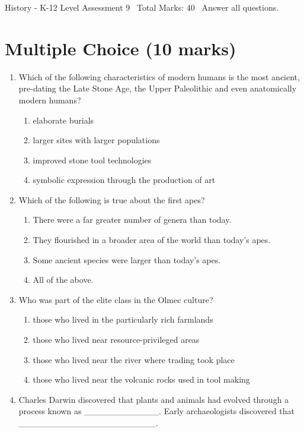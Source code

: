 \documentclass[12pt]{article}
\begin{document}
\begin{center}
History - K-12 Level Assessment 9 \
Total Marks: 40 \
Answer all questions.
\end{center}

\section*{Multiple Choice (10 marks)}
\begin{enumerate}[label=\arabic*.]
\item Which of the following characteristics of modern humans is the most ancient, pre-dating the Late Stone Age, the Upper Paleolithic and even anatomically modern humans?
\begin{enumerate}[label=(\alph*)]
    \item elaborate burials
    \item larger sites with larger populations
    \item improved stone tool technologies
    \item symbolic expression through the production of art
\end{enumerate}
\item Which of the following is true about the first apes?
\begin{enumerate}[label=(\alph*)]
    \item There were a far greater number of genera than today.
    \item They flourished in a broader area of the world than today's apes.
    \item Some ancient species were larger than today's apes.
    \item All of the above.
\end{enumerate}
\item Who was part of the elite class in the Olmec culture?
\begin{enumerate}[label=(\alph*)]
    \item those who lived in the particularly rich farmlands
    \item those who lived near resource-privileged areas
    \item those who lived near the river where trading took place
    \item those who lived near the volcanic rocks used in tool making
\end{enumerate}
\item Charles Darwin discovered that plants and animals had evolved through a process known as \_\_\_\_\_\_\_\_\_\_\_\_. Early archaeologists discovered that \_\_\_\_\_\_\_\_\_\_\_\_\_\_\_\_\_\_\_\_\_\_.

\end{enumerate}
\end{document}
